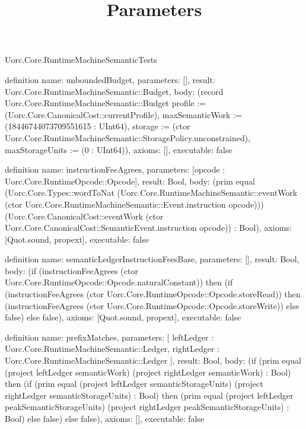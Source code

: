 \begin{lexlean}{Uorc.Core.RuntimeMachineSemanticTests}








\title{Parameters}

\begin{semanticmodule}
definition{
  name: unboundedBudget,
  parameters: [],
  result: Uorc.Core.RuntimeMachineSemantic::Budget,
  body: (record Uorc.Core.RuntimeMachineSemantic::Budget {profile := (Uorc.Core.CanonicalCost::currentProfile), maxSemanticWork := (18446744073709551615 : UInt64), storage := (ctor Uorc.Core.RuntimeMachineSemantic::StoragePolicy.unconstrained), maxStorageUnits := (0 : UInt64)}),
  axioms: [],
  executable: false
}

definition{
  name: instructionFeeAgrees,
  parameters: [opcode : Uorc.Core.RuntimeOpcode::Opcode],
  result: Bool,
  body: (prim equal (Uorc.Core.Types::wordToNat (Uorc.Core.RuntimeMachineSemantic::eventWork (ctor Uorc.Core.RuntimeMachineSemantic::Event.instruction opcode))) (Uorc.Core.CanonicalCost::eventWork (ctor Uorc.Core.CanonicalCost::SemanticEvent.instruction opcode)) : Bool),
  axioms: [Quot.sound, propext],
  executable: false
}

definition{
  name: semanticLedgerInstructionFeesBase,
  parameters: [],
  result: Bool,
  body: (if (instructionFeeAgrees (ctor Uorc.Core.RuntimeOpcode::Opcode.naturalConstant)) then (if (instructionFeeAgrees (ctor Uorc.Core.RuntimeOpcode::Opcode.storeRead)) then (instructionFeeAgrees (ctor Uorc.Core.RuntimeOpcode::Opcode.storeWrite)) else false) else false),
  axioms: [Quot.sound, propext],
  executable: false
}

definition{
  name: prefixMatches,
  parameters: [
    leftLedger : Uorc.Core.RuntimeMachineSemantic::Ledger,
    rightLedger : Uorc.Core.RuntimeMachineSemantic::Ledger
  ],
  result: Bool,
  body: (if (prim equal (project leftLedger semanticWork) (project rightLedger semanticWork) : Bool) then (if (prim equal (project leftLedger semanticStorageUnits) (project rightLedger semanticStorageUnits) : Bool) then (prim equal (project leftLedger peakSemanticStorageUnits) (project rightLedger peakSemanticStorageUnits) : Bool) else false) else false),
  axioms: [],
  executable: false
}


\end{semanticmodule}
\end{lexlean}
